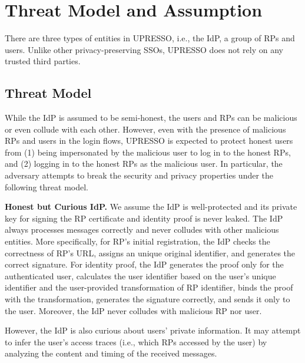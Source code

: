 \section{Threat Model and Assumption}
\label{sec:assumptionandthreatmodel}
There are three types of entities in UPRESSO, i.e., the IdP, a group of RPs and users. Unlike other privacy-preserving SSOs, UPRESSO does not rely on any trusted third parties.

\subsection{Threat Model}
While the IdP is assumed to be semi-honest, the users and RPs can be malicious or even collude with each other. However, even with the presence of malicious RPs and users in the login flows, UPRESSO is expected to protect honest users from (1) being impersonated by the malicious user to log in to the honest RPs, and (2) logging in to the honest RPs as the malicious user.
In particular, the adversary attempts to break the security and privacy properties under the following threat model.

\vspace{1mm}\noindent \textbf{Honest but Curious IdP.}
We assume the IdP is well-protected and its private key for signing the RP certificate and identity proof is never leaked. The IdP always processes messages correctly and never colludes with other malicious entities. More specifically, for RP's initial registration, the IdP checks the correctness of RP's URL,  assigns an unique original identifier, and generates the correct signature. For identity proof, the IdP generates the proof only for the authenticated user, calculates the user identifier based on the user's unique identifier
and the user-provided transformation of RP identifier, binds the proof with the transformation, generates the signature correctly, and sends it only to the user. Moreover, the IdP never colludes with malicious RP nor user.

However, the IdP is also curious about users' private information. It may attempt to infer the user's access traces (i.e., which RPs accessed by the user) by analyzing the content and timing of the received messages. %

